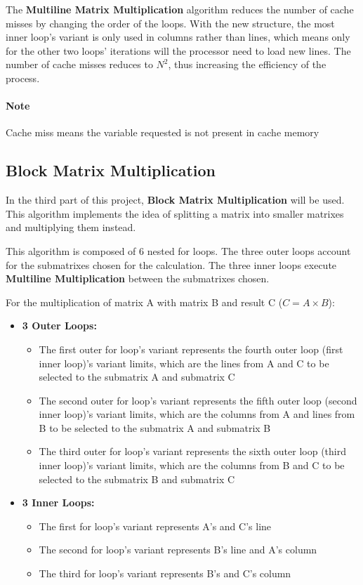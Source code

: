 The \textbf{Multiline Matrix Multiplication} algorithm reduces the number of cache misses by changing the order of the loops. With the new structure, the most inner loop's variant is only used in columns rather than lines, which means only for the other two loops' iterations will the processor need to load new lines. The number of cache misses reduces to $N^2$, thus increasing the efficiency of the process.

\paragraph{Note} Cache miss means the variable requested is not present in cache memory


\subsection{Block Matrix Multiplication}
In the third part of this project, \textbf{Block Matrix Multiplication} will be used. This algorithm implements the idea of splitting a matrix into smaller matrixes and multiplying them instead. 

This algorithm is composed of 6 nested for loops. The three outer loops account for the submatrixes chosen for the calculation. The three inner loops execute \textbf{Multiline Multiplication} between the submatrixes chosen.

For the multiplication of matrix A with matrix B and result C ($C = A \times B$):

\begin{itemize}
    \item \textbf{3 Outer Loops:}
    \begin{itemize}
        \item The first outer for loop's variant represents the fourth outer loop (first inner loop)'s variant limits, which are the lines from A and C to be selected to the submatrix A and submatrix C
        \item The second outer for loop's variant represents the fifth outer loop (second inner loop)'s variant limits, which are the columns from A and lines from B to be selected to the submatrix A and submatrix B
        \item The third outer for loop's variant represents the sixth outer loop (third inner loop)'s variant limits, which are the columns from B and C to be selected to the submatrix B and submatrix C
    \end{itemize}
    \item \textbf{3 Inner Loops:}
    \begin{itemize}
        \item The first for loop's variant represents A's and C's line
        \item The second for loop's variant represents B's line and A's column
        \item The third for loop's variant represents B's and C's column
    \end{itemize}
\end{itemize}


